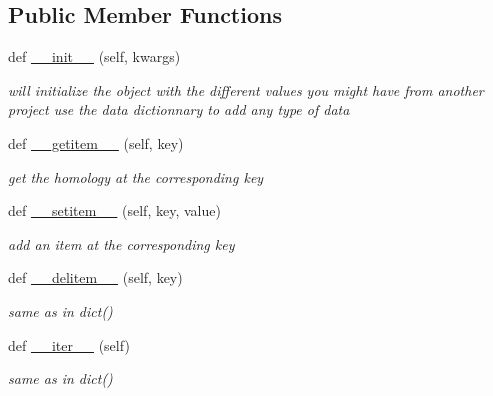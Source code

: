 \subsection*{Public Member Functions}
\begin{DoxyCompactItemize}
\item 
def \mbox{\hyperlink{class_py_c_u_b_1_1homoset_1_1_homo_set_adbe4d9e4087fe5b53d861476c011329d}{\+\_\+\+\_\+init\+\_\+\+\_\+}} (self, kwargs)
\begin{DoxyCompactList}\small\item\em will initialize the object with the different values you might have from another project use the data dictionnary to add any type of data \end{DoxyCompactList}\item 
def \mbox{\hyperlink{class_py_c_u_b_1_1homoset_1_1_homo_set_ab7ac33ea3033b440816e179cb4a5e3c0}{\+\_\+\+\_\+getitem\+\_\+\+\_\+}} (self, key)
\begin{DoxyCompactList}\small\item\em get the homology at the corresponding key \end{DoxyCompactList}\item 
def \mbox{\hyperlink{class_py_c_u_b_1_1homoset_1_1_homo_set_a42a7e7dc7ddb4b5717084cb093f90774}{\+\_\+\+\_\+setitem\+\_\+\+\_\+}} (self, key, value)
\begin{DoxyCompactList}\small\item\em add an item at the corresponding key \end{DoxyCompactList}\item 
def \mbox{\hyperlink{class_py_c_u_b_1_1homoset_1_1_homo_set_a5211ffec9061ca49c771d070048524a1}{\+\_\+\+\_\+delitem\+\_\+\+\_\+}} (self, key)
\begin{DoxyCompactList}\small\item\em same as in dict() \end{DoxyCompactList}\item 
\mbox{\label{class_py_c_u_b_1_1homoset_1_1_homo_set_a2d35b1436a2bbdaea69454ffbf648bf0}} 
def \mbox{\hyperlink{class_py_c_u_b_1_1homoset_1_1_homo_set_a2d35b1436a2bbdaea69454ffbf648bf0}{\+\_\+\+\_\+iter\+\_\+\+\_\+}} (self)
\begin{DoxyCompactList}\small\item\em same as in dict() \end{DoxyCompactList}\item 
\mbox{\label{class_py_c_u_b_1_1homoset_1_1_homo_set_aefca94ad0e64bcad582edcc163bc21ad}} 

\end{DoxyCompactItemize}
